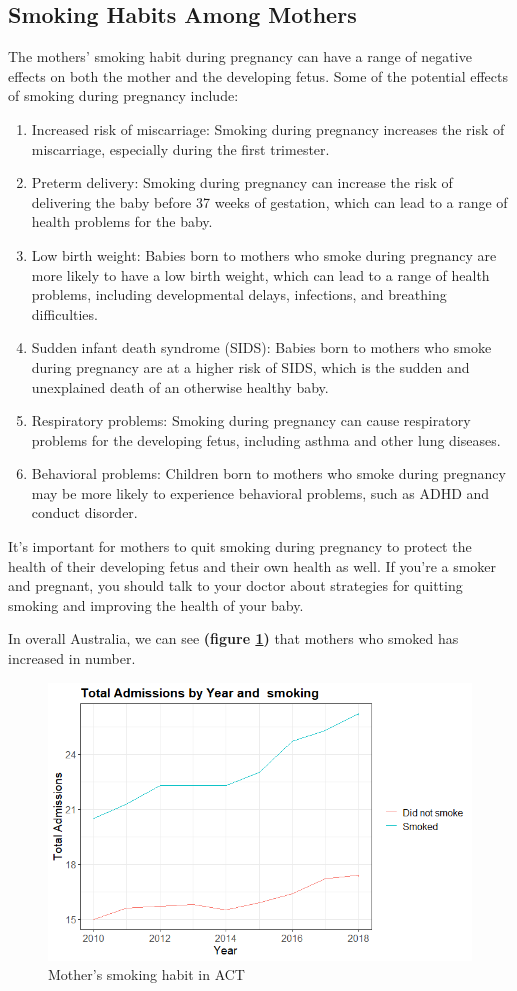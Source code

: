 \subsection{Smoking Habits Among Mothers}
The mothers' smoking habit during pregnancy can have a range of negative effects on both the mother and the developing fetus. Some of the potential effects of smoking during pregnancy include:

\begin{enumerate}
    \item Increased risk of miscarriage: Smoking during pregnancy increases the risk of miscarriage, especially during the first trimester.
    \item Preterm delivery: Smoking during pregnancy can increase the risk of delivering the baby before 37 weeks of gestation, which can lead to a range of health problems for the baby.
    \item Low birth weight: Babies born to mothers who smoke during pregnancy are more likely to have a low birth weight, which can lead to a range of health problems, including developmental delays, infections, and breathing difficulties.
    \item Sudden infant death syndrome (SIDS): Babies born to mothers who smoke during pregnancy are at a higher risk of SIDS, which is the sudden and unexplained death of an otherwise healthy baby.
    \item Respiratory problems: Smoking during pregnancy can cause respiratory problems for the developing fetus, including asthma and other lung diseases.
    \item Behavioral problems: Children born to mothers who smoke during pregnancy may be more likely to experience behavioral problems, such as ADHD and conduct disorder.
\end{enumerate}

It's important for mothers to quit smoking during pregnancy to protect the health of their developing fetus and their own health as well. If you're a smoker and pregnant, you should talk to your doctor about strategies for quitting smoking and improving the health of your baby.

In overall Australia, we can see \textbf{(figure \ref{fig:smoking_au})} that mothers who smoked has increased in number.
\begin{figure}
  \centering
  \includegraphics[width=.75\textwidth]{subsections/smoking/smoking_aus.png}
  \caption{Mother's smoking habit in ACT}
  \label{fig:smoking_au}
\end{figure}

